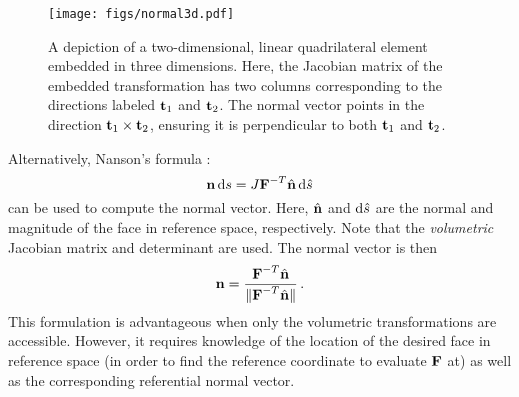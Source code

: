 \documentclass[../doc.tex]{subfiles}
\begin{document}
\begin{figure}
\centering
\texttt{[image: figs/normal3d.pdf]}
\caption{A depiction of a two-dimensional, linear quadrilateral element embedded in three dimensions. Here, the Jacobian matrix of the embedded transformation has two columns corresponding to the directions labeled $\boldsymbol{\mathrm{t}}_1$ and $\boldsymbol{\mathrm{t}}_2$. The normal vector points in the direction $\boldsymbol{\mathrm{t}}_1 \times \boldsymbol{\mathrm{t}}_2$, ensuring it is perpendicular to both $\boldsymbol{\mathrm{t}}_1$ and $\boldsymbol{\mathrm{t}}_2$. }
\label{fem:normal_diag3d}
\end{figure}

Alternatively, Nanson's formula \cite{ciarlet_elasticity,oden1971finite}: 
	\begin{equation}
		\boldsymbol{\mathrm{n}} \mathop{}\!\mathrm{d} s = J \boldsymbol{\mathrm{F}}^{-T} \hat{\boldsymbol{\mathrm{n}}} \mathop{}\!\mathrm{d} \hat{s} 
	\end{equation}
can be used to compute the normal vector. Here, $\hat{\boldsymbol{\mathrm{n}}}$ and $\mathop{}\!\mathrm{d} \hat{s}$ are the normal and magnitude of the face in reference space, respectively. Note that the \emph{volumetric} Jacobian matrix and determinant are used. The normal vector is then 
	\begin{equation}
		\boldsymbol{\mathrm{n}} = \frac{\boldsymbol{\mathrm{F}}^{-T} \hat{\boldsymbol{\mathrm{n}}}}{\| \boldsymbol{\mathrm{F}}^{-T} \hat{\boldsymbol{\mathrm{n}}}\|} \,. 
	\end{equation}
This formulation is advantageous when only the volumetric transformations are accessible. However, it requires knowledge of the location of the desired face in reference space (in order to find the reference coordinate to evaluate $\boldsymbol{\mathrm{F}}$ at) as well as the corresponding referential normal vector. 
\end{document}
